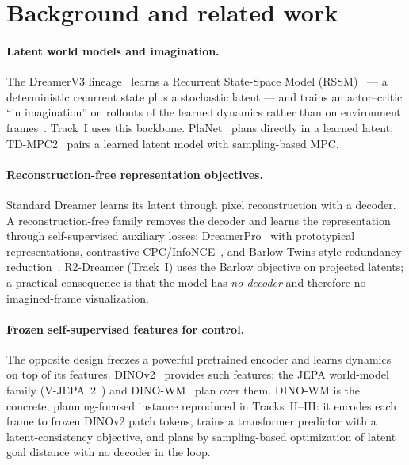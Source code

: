 \documentclass[11pt,a4paper]{article}
\begin{document}
\section{Background and related work}
\label{sec:background}

\paragraph{Latent world models and imagination.} The DreamerV3
lineage~\cite{dreamer,dreamerv2,dreamerv3} learns a Recurrent State-Space
Model (RSSM)~\cite{planet} --- a deterministic recurrent state plus a stochastic
latent --- and trains an actor--critic ``in imagination'' on rollouts of the
learned dynamics rather than on environment frames~\cite{dreamer}. Track~I uses
this backbone. PlaNet~\cite{planet} plans directly in a learned latent;
TD-MPC2~\cite{tdmpc2} pairs a learned latent model with sampling-based MPC.

\paragraph{Reconstruction-free representation objectives.} Standard Dreamer
learns its latent through pixel reconstruction with a decoder. A
reconstruction-free family removes the decoder and learns the representation
through self-supervised auxiliary losses: DreamerPro~\cite{dreamerpro} with
prototypical representations, contrastive CPC/InfoNCE~\cite{cpc}, and
Barlow-Twins-style redundancy reduction~\cite{barlow}. R2-Dreamer (Track~I)
uses the Barlow objective on projected latents; a practical consequence is that
the model has \emph{no decoder} and therefore no imagined-frame visualization.

\paragraph{Frozen self-supervised features for control.} The opposite design
freezes a powerful pretrained encoder and learns dynamics on top of its
features. DINOv2~\cite{dinov2} provides such features; the JEPA world-model
family (V-JEPA~2~\cite{vjepa2}) and DINO-WM~\cite{dinowm2025} plan over them.
DINO-WM is the concrete, planning-focused instance reproduced in Tracks~II--III:
it encodes each frame to frozen DINOv2 patch tokens, trains a transformer
predictor with a latent-consistency objective, and plans by sampling-based
optimization of latent goal distance with no decoder in the loop.
\end{document}
